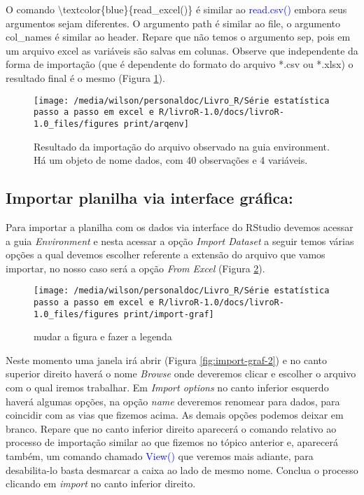 \documentclass[titlepage, oneside, openany, a4paper]{book}
\begin{document}
O comando \textbackslash{}textcolor\{blue\}\{read\_excel()\} é similar ao \textcolor{blue}{read.csv()} embora seus argumentos sejam diferentes. O argumento path é similar ao file, o argumento col\_names é similar ao header. Repare que não temos o argumento sep, pois em um arquivo excel as variáveis são salvas em colunas. Observe que independente da forma de importação (que é dependente do formato do arquivo *.csv ou *.xlsx) o resultado final é o mesmo (Figura \ref{fig:arqenv}).

\begin{figure}

{\centering \texttt{[image: /media/wilson/personaldoc/Livro\_R/Série estatística passo a passo em excel e R/livroR-1.0/docs/livroR-1.0\_files/figures print/arqenv]} 

}

\caption{Resultado da importação do arquivo observado na guia environment. Há um objeto de nome dados, com 40 observações e 4 variáveis.}\label{fig:arqenv}
\end{figure}

\hypertarget{importar-planilha-via-interface-gruxe1fica}{%
\subsection{Importar planilha via interface gráfica:}\label{importar-planilha-via-interface-gruxe1fica}}

Para importar a planilha com os dados via interface do RStudio devemos acessar a guia \emph{Environment} e nesta acessar a opção \emph{Import Dataset} a seguir temos várias opções a qual devemos escolher referente a extensão do arquivo que vamos importar, no nosso caso será a opção \emph{From Excel} (Figura \ref{fig:import-graf}).

\begin{figure}

{\centering \texttt{[image: /media/wilson/personaldoc/Livro\_R/Série estatística passo a passo em excel e R/livroR-1.0/docs/livroR-1.0\_files/figures print/import-graf]} 

}

\caption{mudar a figura e fazer a legenda}\label{fig:import-graf}
\end{figure}

Neste momento uma janela irá abrir (Figura \ref{fig:import-graf-2}) e no canto superior direito haverá o nome \emph{Browse} onde deveremos clicar e escolher o arquivo com o qual iremos trabalhar. Em \emph{Import options} no canto inferior esquerdo haverá algumas opções, na opção \emph{name} deveremos renomear para dados, para coincidir com as vias que fizemos acima. As demais opções podemos deixar em branco. Repare que no canto inferior direito aparecerá o comando relativo ao processo de importação similar ao que fizemos no tópico anterior e, aparecerá também, um comando chamado \textcolor{blue}{View()} que veremos mais adiante, para desabilita-lo basta desmarcar a caixa ao lado de mesmo nome. Conclua o processo clicando em \emph{import} no canto inferior direito.
\end{document}
